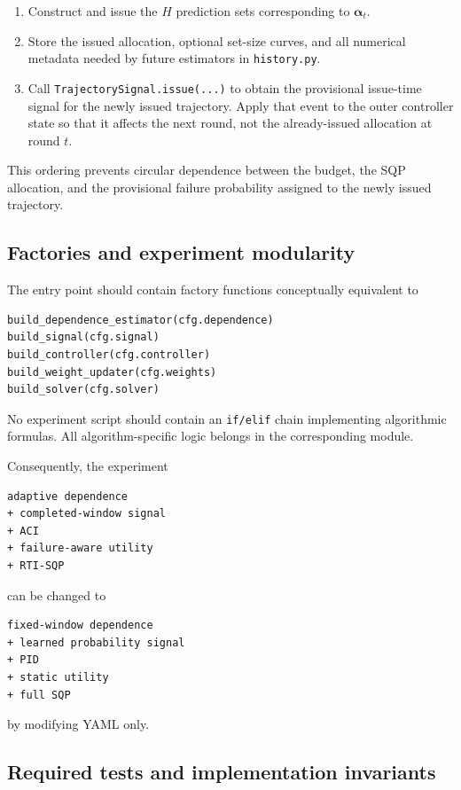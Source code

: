 \documentclass[11pt]{article}
\begin{document}
\begin{enumerate}[leftmargin=*]
    \item Construct and issue the $H$ prediction sets corresponding to
    $\bm\alpha_t$.

    \item Store the issued allocation, optional set-size curves, and all
    numerical metadata needed by future estimators in \texttt{history.py}.

    \item Call
    \texttt{TrajectorySignal.issue(...)} to obtain the provisional
    issue-time signal for the newly issued trajectory.  Apply that event to
    the outer controller state so that it affects the next round, not the
    already-issued allocation at round $t$.
\end{enumerate}

This ordering prevents circular dependence between the budget, the SQP
allocation, and the provisional failure probability assigned to the newly
issued trajectory.

\subsection{Factories and experiment modularity}

The entry point should contain factory functions conceptually equivalent to

\begin{verbatim}
build_dependence_estimator(cfg.dependence)
build_signal(cfg.signal)
build_controller(cfg.controller)
build_weight_updater(cfg.weights)
build_solver(cfg.solver)
\end{verbatim}

No experiment script should contain an \texttt{if/elif} chain implementing
algorithmic formulas.  All algorithm-specific logic belongs in the
corresponding module.

Consequently, the experiment

\begin{verbatim}
adaptive dependence
+ completed-window signal
+ ACI
+ failure-aware utility
+ RTI-SQP
\end{verbatim}

can be changed to

\begin{verbatim}
fixed-window dependence
+ learned probability signal
+ PID
+ static utility
+ full SQP
\end{verbatim}

by modifying YAML only.

\subsection{Required tests and implementation invariants}
\label{app:implementation-tests}
\end{document}
